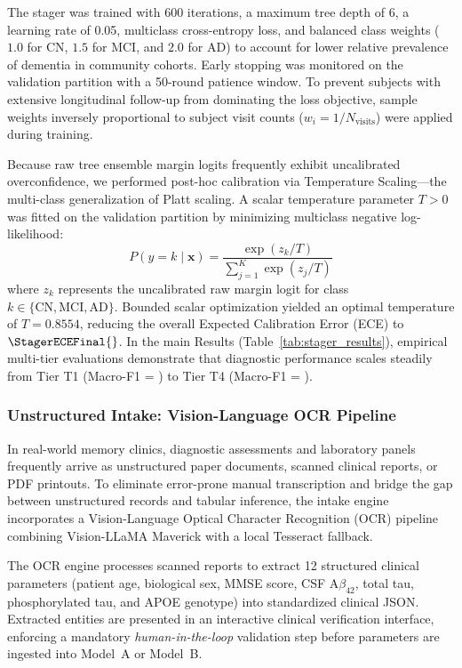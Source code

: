 The stager was trained with 600 iterations, a maximum tree depth of 6, a learning rate of 0.05, multiclass cross-entropy loss, and balanced class weights ($1.0$ for CN, $1.5$ for MCI, and $2.0$ for AD) to account for lower relative prevalence of dementia in community cohorts. Early stopping was monitored on the validation partition with a 50-round patience window. To prevent subjects with extensive longitudinal follow-up from dominating the loss objective, sample weights inversely proportional to subject visit counts ($w_i = 1 / N_{\text{visits}}$) were applied during training.

Because raw tree ensemble margin logits frequently exhibit uncalibrated overconfidence, we performed post-hoc calibration via Temperature Scaling—the multi-class generalization of Platt scaling. A scalar temperature parameter $T > 0$ was fitted on the validation partition by minimizing multiclass negative log-likelihood:
\begin{equation}
    P(y = k \mid \mathbf{x}) = \frac{\exp(z_k / T)}{\sum_{j=1}^{K} \exp(z_j / T)}
\end{equation}
where $z_k$ represents the uncalibrated raw margin logit for class $k \in \{\text{CN}, \text{MCI}, \text{AD}\}$. Bounded scalar optimization yielded an optimal temperature of $T = 0.8554$, reducing the overall Expected Calibration Error (ECE) to $\StagerECEFinal{}$. In the main Results (Table~\ref{tab:stager_results}), empirical multi-tier evaluations demonstrate that diagnostic performance scales steadily from Tier T1 (Macro-F1 = \StagerTOneFOne{}) to Tier T4 (Macro-F1 = \StagerTFourFOne{}).

\subsubsection{Unstructured Intake: Vision-Language OCR Pipeline}
In real-world memory clinics, diagnostic assessments and laboratory panels frequently arrive as unstructured paper documents, scanned clinical reports, or PDF printouts. To eliminate error-prone manual transcription and bridge the gap between unstructured records and tabular inference, the intake engine incorporates a Vision-Language Optical Character Recognition (OCR) pipeline combining Vision-LLaMA Maverick with a local Tesseract fallback. 

The OCR engine processes scanned reports to extract 12 structured clinical parameters (patient age, biological sex, MMSE score, CSF $\text{A}\beta_{42}$, total tau, phosphorylated tau, and APOE genotype) into standardized clinical JSON. Extracted entities are presented in an interactive clinical verification interface, enforcing a mandatory \textit{human-in-the-loop} validation step before parameters are ingested into Model~A or Model~B.

